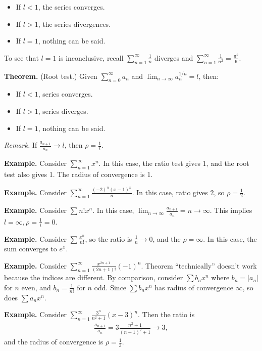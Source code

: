 \documentclass{article}
\begin{document}
\begin{itemize}
  \item If $l < 1$, the series converges.
  \item If $ l > 1$, the series divergences.
  \item If $l = 1$, nothing can be said.
\end{itemize}

To see that $l = 1$ is inconclusive, recall $\sum_{n=1}^{\infty} \frac{1}{n}$ diverges and $\sum_{n=1}^{\infty} \frac{1}{n^2} = \frac{\pi^2}{6}$.


{\bf Theorem.} (Root test.) Given $\sum_{n=0}^{\infty} a_n$ and $\lim_{n \to \infty} a_n^{1/n} = l$, then:

\begin{itemize}
  \item If $l < 1$, series converges.
  \item If $l > 1$, series diverges.
  \item If $l = 1$, nothing can be said.
\end{itemize}

{\it Remark.} If $\frac{a_{n+1}}{a_n} \to l$, then $\rho = \frac{1}{l}$.

{\bf Example.} Consider $\sum_{n=1}^{\infty} x^n$.  In this case, the ratio test gives 1, and the root test also gives 1.  The radius of convergence is 1.

{\bf Example.} Consider $\sum_{n=1}^{\infty} \frac{(-2)^n (x-1)^n}{n}$.  In this case, ratio gives 2, so $\rho = \frac{1}{2}$.

{\bf Example.} Consider $\sum n! x^n$.  In this case, $\lim_{n \to \infty} \frac{a_{n+1}}{a_n} = n \to \infty$.  This implies $l = \infty, \rho = \frac{1}{l} = 0$.

{\bf Example.} Consider $\sum \frac{x^n}{n!}$, so the ratio is $\frac{1}{n} \to 0$, and the $\rho = \infty$.  In this case, the sum converges to $e^x$.

{\bf Example.} Consider $\sum_{n=1}^{\infty} \frac{x^{2n+1}}{(2n+1)!} (-1)^n$.  Theorem ``technically'' doesn't work because the indices are different.  By comparison, consider $\sum b_n x^n$ where $b_n = |a_n|$ for $n$ even, and $b_n = \frac{1}{n!}$ for $n$ odd.  Since $\sum b_n x^n$ has radius of convergence $\infty$, so does $\sum a_n x^n$.

{\bf Example.} Consider $\sum_{n=1}^{\infty} \frac{3^n}{n^2+1} (x-3)^n$.  Then the ratio is
\begin{align*}
  \frac{a_{n+1}}{a_n} = 3 \frac{n^2+1}{(n+1)^2 + 1} \to 3,
\end{align*}
and the radius of convergence is $\rho = \frac{1}{3}$.
\end{document}
